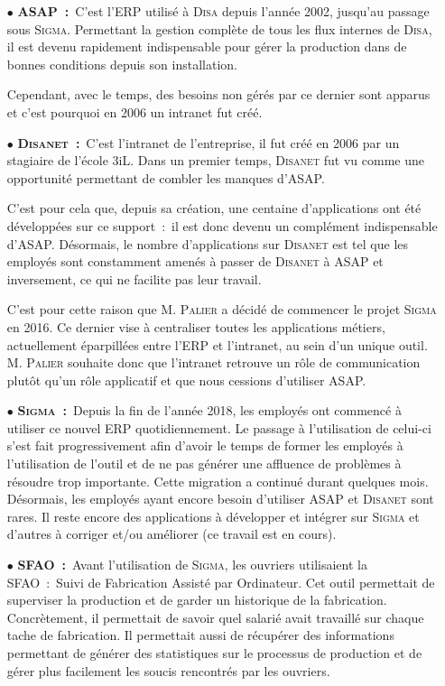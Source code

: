 \begin{itemize}
    \item[\tiny$\bullet$] \textbf{ASAP~:}~C'est l'ERP utilisé à \textsc{Disa} depuis l'année 2002, jusqu'au passage sous \textsc{Sigma}.
    Permettant la gestion complète de tous les flux internes de \textsc{Disa}, il est devenu rapidement indispensable pour gérer la production dans de bonnes conditions depuis son installation.
    
    Cependant, avec le temps, des besoins non gérés par ce dernier sont apparus et c'est pourquoi en 2006 un intranet fut créé.
    
    \item[\tiny$\bullet$] \textbf{\textsc{Disanet}~:}~C'est l'intranet de l'entreprise, il fut créé en 2006 par un stagiaire de l'école 3iL.
    Dans un premier temps, \textsc{Disanet} fut vu comme une opportunité permettant de combler les manques d’ASAP.
    
    C’est pour cela que, depuis sa création, une centaine d'applications ont été développées sur ce support~:~il est donc devenu un complément indispensable d’ASAP.
    Désormais, le nombre d'applications sur \textsc{Disanet} est tel que les employés sont constamment amenés à passer de \textsc{Disanet} à ASAP et inversement, ce qui ne facilite pas leur travail.
    
    C’est pour cette raison que M. \textsc{Palier} a décidé de commencer le projet \textsc{Sigma} en 2016.
    Ce dernier vise à centraliser toutes les applications métiers, actuellement éparpillées entre l’ERP et l’intranet, au sein d’un unique outil.
    M. \textsc{Palier} souhaite donc que l’intranet retrouve un rôle de communication plutôt qu’un rôle applicatif et que nous cessions d'utiliser ASAP.
    
    \item[\tiny$\bullet$] \textbf{\textsc{Sigma}~:}~Depuis la fin de l'année 2018, les employés ont commencé à utiliser ce nouvel ERP quotidiennement.
    Le passage à l'utilisation de celui-ci s'est fait progressivement afin d'avoir le temps de former les employés à l'utilisation de l'outil et de ne pas générer une affluence de problèmes à résoudre trop importante.
    Cette migration a continué durant quelques mois.
    Désormais, les employés ayant encore besoin d'utiliser ASAP et \textsc{Disanet} sont rares.
    Il reste encore des applications à développer et intégrer sur \textsc{Sigma} et d'autres à corriger et/ou améliorer (ce travail est en cours).
    
    \item[\tiny$\bullet$] \textbf{SFAO~:}~Avant l'utilisation de \textsc{Sigma}, les ouvriers utilisaient la SFAO~:~Suivi de Fabrication Assisté par Ordinateur.
    Cet outil permettait de superviser la production et de garder un historique de la fabrication.
    Concrètement, il permettait de savoir quel salarié avait travaillé sur chaque tache de fabrication.
    Il permettait aussi de récupérer des informations permettant de générer des statistiques sur le processus de production et de gérer plus facilement les soucis rencontrés par les ouvriers.
    

\end{itemize}
